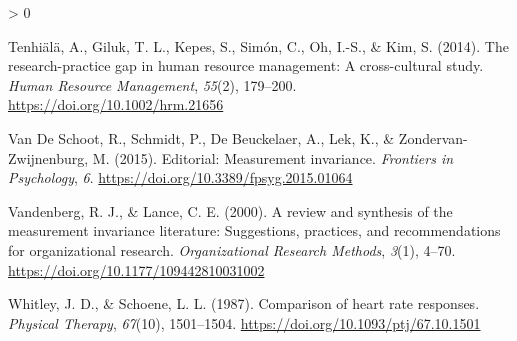 \documentclass[
12pt, %
twoside,
english]{guelphthesis}
\newlength{\cslhangindent}
\newenvironment{CSLReferences}[2] %
 {%
  \setlength{\parindent}{0pt}
  \ifodd #1 \everypar{\setlength{\hangindent}{\cslhangindent}}\ignorespaces\fi
  \ifnum #2 > 0
  \setlength{\parskip}{\linespacing{2}}
  \fi
 }%
 {}
\begin{document}
\begin{CSLReferences}{1}{0}
\leavevmode{}%
Tenhiälä, A., Giluk, T. L., Kepes, S., Simón, C., Oh, I.-S., \& Kim, S. (2014). The research-practice gap in human resource management: A cross-cultural study. \emph{Human Resource Management}, \emph{55}(2), 179--200. \url{https://doi.org/10.1002/hrm.21656}

\leavevmode{}%
Van De Schoot, R., Schmidt, P., De Beuckelaer, A., Lek, K., \& Zondervan-Zwijnenburg, M. (2015). Editorial: Measurement invariance. \emph{Frontiers in Psychology}, \emph{6}. \url{https://doi.org/10.3389/fpsyg.2015.01064}

\leavevmode{}%
Vandenberg, R. J., \& Lance, C. E. (2000). A review and synthesis of the measurement invariance literature: Suggestions, practices, and recommendations for organizational research. \emph{Organizational Research Methods}, \emph{3}(1), 4--70. \url{https://doi.org/10.1177/109442810031002}

\leavevmode{}%
Whitley, J. D., \& Schoene, L. L. (1987). Comparison of heart rate responses. \emph{Physical Therapy}, \emph{67}(10), 1501--1504. \url{https://doi.org/10.1093/ptj/67.10.1501}

\end{CSLReferences}
\endgroup
\end{document}
